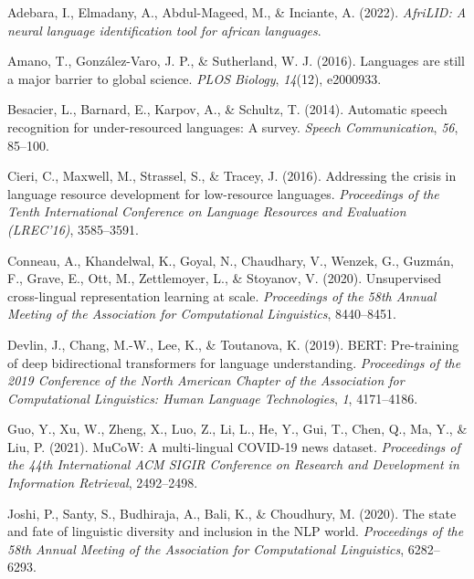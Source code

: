 \documentclass[
]{article}
\newlength{\cslhangindent}
\newenvironment{CSLReferences}[2] %
 {\begin{list}{}{%
  \setlength{\itemindent}{0pt}
  \setlength{\leftmargin}{0pt}
  \setlength{\parsep}{0pt}
  \ifodd #1
   \setlength{\leftmargin}{\cslhangindent}
   \setlength{\itemindent}{-1\cslhangindent}
  \fi
  \setlength{\itemsep}{#2\baselineskip}}}
 {\end{list}}
\begin{document}
\label{refs}
\begin{CSLReferences}{1}{0}
Adebara, I., Elmadany, A., Abdul-Mageed, M., \& Inciante, A. (2022).
\emph{AfriLID: A neural language identification tool for african
languages}.

Amano, T., González-Varo, J. P., \& Sutherland, W. J. (2016). Languages
are still a major barrier to global science. \emph{PLOS Biology},
\emph{14}(12), e2000933.

Besacier, L., Barnard, E., Karpov, A., \& Schultz, T. (2014). Automatic
speech recognition for under-resourced languages: A survey. \emph{Speech
Communication}, \emph{56}, 85--100.

Cieri, C., Maxwell, M., Strassel, S., \& Tracey, J. (2016). Addressing
the crisis in language resource development for low-resource languages.
\emph{Proceedings of the Tenth International Conference on Language
Resources and Evaluation (LREC'16)}, 3585--3591.

Conneau, A., Khandelwal, K., Goyal, N., Chaudhary, V., Wenzek, G.,
Guzmán, F., Grave, E., Ott, M., Zettlemoyer, L., \& Stoyanov, V. (2020).
Unsupervised cross-lingual representation learning at scale.
\emph{Proceedings of the 58th Annual Meeting of the Association for
Computational Linguistics}, 8440--8451.

Devlin, J., Chang, M.-W., Lee, K., \& Toutanova, K. (2019). BERT:
Pre-training of deep bidirectional transformers for language
understanding. \emph{Proceedings of the 2019 Conference of the North
American Chapter of the Association for Computational Linguistics: Human
Language Technologies}, \emph{1}, 4171--4186.

Guo, Y., Xu, W., Zheng, X., Luo, Z., Li, L., He, Y., Gui, T., Chen, Q.,
Ma, Y., \& Liu, P. (2021). MuCoW: A multi-lingual COVID-19 news dataset.
\emph{Proceedings of the 44th International ACM SIGIR Conference on
Research and Development in Information Retrieval}, 2492--2498.

Joshi, P., Santy, S., Budhiraja, A., Bali, K., \& Choudhury, M. (2020).
The state and fate of linguistic diversity and inclusion in the NLP
world. \emph{Proceedings of the 58th Annual Meeting of the Association
for Computational Linguistics}, 6282--6293.


\end{CSLReferences}
\end{document}
